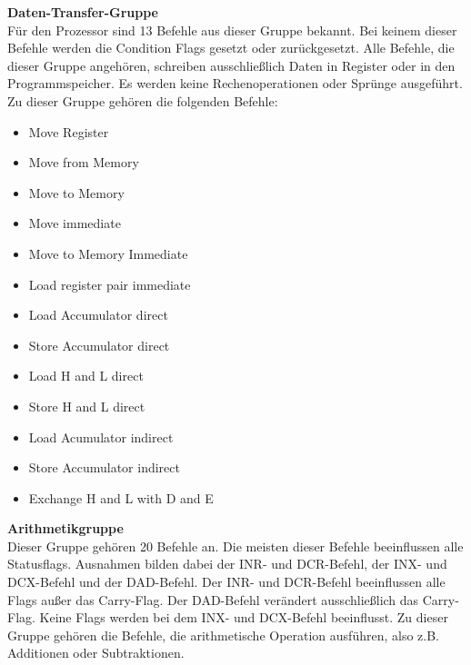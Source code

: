 \documentclass[12pt]{article}
\begin{document}
\noindent
\textbf{Daten-Transfer-Gruppe}\\
Für den Prozessor sind 13 Befehle aus dieser Gruppe bekannt. Bei keinem dieser Befehle werden die Condition Flags gesetzt oder zurückgesetzt. Alle Befehle, die dieser Gruppe angehören, schreiben ausschließlich Daten in Register oder in den Programmspeicher. Es werden keine Rechenoperationen oder Sprünge ausgeführt. Zu dieser Gruppe gehören die folgenden Befehle:

\begin{multicols}{2}
\begin{itemize}
\item Move Register
\item Move from Memory
\item Move to Memory
\item Move immediate
\item Move to Memory Immediate
\item Load register pair immediate
\item Load Accumulator direct
\item Store Accumulator direct
\item Load H and L direct
\item Store H and L direct
\item Load Acumulator indirect
\item Store Accumulator indirect
\item Exchange H and L with D and E
\end{itemize}
\end{multicols}

\vspace{10pt}
\noindent
\textbf{Arithmetikgruppe}\\
Dieser Gruppe gehören 20 Befehle an. Die meisten dieser Befehle beeinflussen alle Statusflags. Ausnahmen bilden dabei der INR- und DCR-Befehl, der INX- und DCX-Befehl und der DAD-Befehl. Der INR- und DCR-Befehl beeinflussen alle Flags außer das Carry-Flag. Der DAD-Befehl verändert ausschließlich das Carry-Flag. Keine Flags werden bei dem INX- und DCX-Befehl beeinflusst. Zu dieser Gruppe gehören die Befehle, die arithmetische Operation ausführen, also z.B. Additionen oder Subtraktionen.
\end{document}
